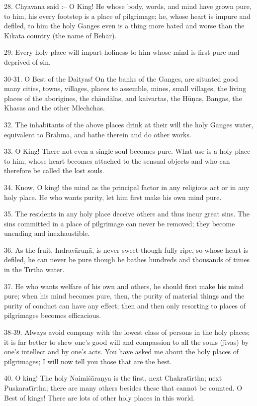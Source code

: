 28. Chyavana said :-- O King! He whose body, words, and mind have grown pure, to him, his every footstep is a place of pilgrimage; he, whose heart is impure and defiled, to him the holy Ganges even is a thing more hated and worse than the K\={\i}kata country (the name of Beh\=ar).

29. Every holy place will impart holiness to him whose mind is first pure and deprived of sin.

30-31. O Best of the Daityas! On the banks of the Ganges, are situated good many cities, towns, villages, places to assemble, mines, small villages, the living places of the aborigines, the ch\=and\=alas, and kaivartas, the H\=u\d{n}as, Bangas, the Khasas and the other Mlechchas.

32. The inhabitants of the above places drink at their will the holy Ganges water, equivalent to Br\=ahma, and bathe therein and do other works.

33. O King! There not even a single soul becomes pure. What use is a holy place to him, whose heart becomes attached to the sensual objects and who can therefore be called the lost souls.

34. Know, O king! the mind as the principal factor in any religious act or in any holy place. He who wants purity, let him first make his own mind pure.

35. The residents in any holy place deceive others and thus incur great sins. The sins committed in a place of pilgrimage can never be removed; they become unending and inexhaustible.

36. As the fruit, Indrav\=aru\d{n}\=a, is never sweet though fully ripe, so whose heart is defiled, he can never be pure though he bathes hundreds and thousands of times in the T\={\i}rtha water.

37. He who wants welfare of his own and others, he should first make his mind pure; when his mind becomes pure, then, the purity of material things and the purity of conduct can have any effect; then and then only resorting to places of pilgrimages becomes efficacious.

38-39. Always avoid company with the lowest class of persons in the holy places; it is far better to shew one's good will and compassion to all the souls (j\={\i}vas) by one's intellect and by one's acts. You have asked me about the holy places of pilgrimages; I will now tell you those that are the best.

40. O king! The holy Naimi\'s\=ara\d{n}ya is the first, next Chakrat\={\i}rtha; next Puskarat\={\i}rtha; there are many others besides these that cannot be counted. O Best of kings! There are lots of other holy places in this world.

